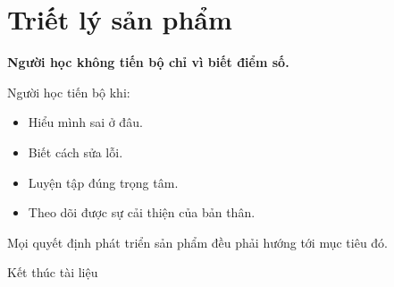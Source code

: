 \documentclass[12pt,a4paper]{article}
\begin{document}
\section{Triết lý sản phẩm}

\begin{summarybox}
\centering
\sffamily\large\bfseries
Người học không tiến bộ chỉ vì biết điểm số.
\end{summarybox}

Người học tiến bộ khi:

\begin{itemize}
  \item Hiểu mình sai ở đâu.
  \item Biết cách sửa lỗi.
  \item Luyện tập đúng trọng tâm.
  \item Theo dõi được sự cải thiện của bản thân.
\end{itemize}

Mọi quyết định phát triển sản phẩm đều phải hướng tới mục tiêu đó.

\vfill
\begin{center}
\sffamily\small\color{BandGray}Kết thúc tài liệu
\end{center}
\end{document}

